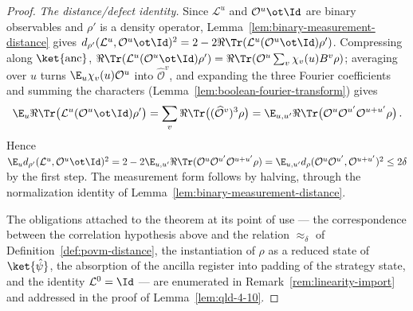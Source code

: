 \begin{proof}
	\emph{The distance/defect identity.} Since $\mathcal{L}^u$ and
	$\mathcal{O}^u \ot \Id$ are binary observables and $\rho'$ is a density
	operator, Lemma~\ref{lem:binary-measurement-distance} gives
	$d_{\rho'}(\mathcal{L}^u, \mathcal{O}^u \ot \Id)^2
	= 2 - 2 \Re \Tr(\mathcal{L}^u (\mathcal{O}^u \ot \Id) \rho')$.
	Compressing along $\ket{\mathrm{anc}}$,
	$\Re \Tr(\mathcal{L}^u (\mathcal{O}^u \ot \Id) \rho')
	= \Re \Tr(\mathcal{O}^u \sum_v \chi_v(u) B^v \rho)$; averaging over $u$
	turns $\E_u \chi_v(u) \mathcal{O}^u$ into $\widehat{\mathcal{O}}^v$, and
	expanding the three Fourier coefficients and summing the characters
	(Lemma~\ref{lem:boolean-fourier-transform}) gives
	\[
		\E_u \Re \Tr\big(\mathcal{L}^u (\mathcal{O}^u \ot \Id) \rho'\big)
		= \sum_v \Re \Tr\big((\widehat{\mathcal{O}}^v)^3 \rho\big)
		= \E_{u,u'} \Re \Tr\big(\mathcal{O}^u \mathcal{O}^{u'}
		\mathcal{O}^{u+u'} \rho\big)\,.
	\]
	Hence
	$\E_u d_{\rho'}(\mathcal{L}^u, \mathcal{O}^u \ot \Id)^2
	= 2 - 2 \E_{u,u'} \Re \Tr(\mathcal{O}^u \mathcal{O}^{u'}
	\mathcal{O}^{u+u'} \rho)
	= \E_{u,u'} d_\rho(\mathcal{O}^u \mathcal{O}^{u'},
	\mathcal{O}^{u+u'})^2 \le 2\delta$ by the first step. The measurement
	form follows by halving, through the normalization identity of
	Lemma~\ref{lem:binary-measurement-distance}.

	The obligations attached to the theorem at its point of use --- the
	correspondence between the correlation hypothesis above and the relation
	$\approx_\delta$ of Definition~\ref{def:povm-distance}, the
	instantiation of $\rho$ as a reduced state of $\ket{\hat\psi}$, the
	absorption of the ancilla register into padding of the strategy state,
	and the identity $\mathcal{L}^0 = \Id$ --- are enumerated in
	Remark~\ref{rem:linearity-import} and addressed in the proof of
	Lemma~\ref{lem:qld-4-10}.
\end{proof}

